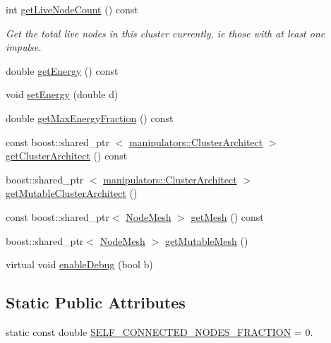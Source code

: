 \begin{DoxyCompactItemize}
int \hyperlink{classcryomesh_1_1structures_1_1Cluster_a3ce93f857f214d814600c24d3bbdadea}{get\-Live\-Node\-Count} () const 
\begin{DoxyCompactList}\small\item\em \-Get the total live nodes in this cluster currently, ie those with at least one impulse. \end{DoxyCompactList}\item 
double \hyperlink{classcryomesh_1_1structures_1_1Cluster_a458206d9c646f0f17c4764d82033e65e}{get\-Energy} () const 
\item 
void \hyperlink{classcryomesh_1_1structures_1_1Cluster_a4c0b2aaaf9c62c3c0ca44d89006ea875}{set\-Energy} (double d)
\item 
double \hyperlink{classcryomesh_1_1structures_1_1Cluster_a85a5b8740ed63cb5774d286577974655}{get\-Max\-Energy\-Fraction} () const 
\item 
const boost\-::shared\-\_\-ptr\*
$<$ \hyperlink{classcryomesh_1_1manipulators_1_1ClusterArchitect}{manipulators\-::\-Cluster\-Architect} $>$ \hyperlink{classcryomesh_1_1structures_1_1Cluster_a8fb496fec3516a3f8ae0ba4c8371b700}{get\-Cluster\-Architect} () const 
\item 
boost\-::shared\-\_\-ptr\*
$<$ \hyperlink{classcryomesh_1_1manipulators_1_1ClusterArchitect}{manipulators\-::\-Cluster\-Architect} $>$ \hyperlink{classcryomesh_1_1structures_1_1Cluster_a05ce2914a0931b0554c85c390a003ca4}{get\-Mutable\-Cluster\-Architect} ()
\item 
const boost\-::shared\-\_\-ptr$<$ \hyperlink{classcryomesh_1_1structures_1_1NodeMesh}{\-Node\-Mesh} $>$ \hyperlink{classcryomesh_1_1structures_1_1Cluster_a6021d2bd085ff3e500d3898b5fabdf88}{get\-Mesh} () const 
\item 
boost\-::shared\-\_\-ptr$<$ \hyperlink{classcryomesh_1_1structures_1_1NodeMesh}{\-Node\-Mesh} $>$ \hyperlink{classcryomesh_1_1structures_1_1Cluster_a3ced101df9aaf02f8afa25cc55c16bfd}{get\-Mutable\-Mesh} ()
\item 
virtual void \hyperlink{classcryomesh_1_1structures_1_1Cluster_a9e5abdfe3802c69b5cacc20b081fd90f}{enable\-Debug} (bool b)
\end{DoxyCompactItemize}
\subsection*{\-Static \-Public \-Attributes}
\begin{DoxyCompactItemize}
\item 
static const double \hyperlink{classcryomesh_1_1structures_1_1Cluster_a42b6ded89948ab38383ce0b818c78b54}{\-S\-E\-L\-F\-\_\-\-C\-O\-N\-N\-E\-C\-T\-E\-D\-\_\-\-N\-O\-D\-E\-S\-\_\-\-F\-R\-A\-C\-T\-I\-O\-N} = 0.
\end{DoxyCompactItemize}
